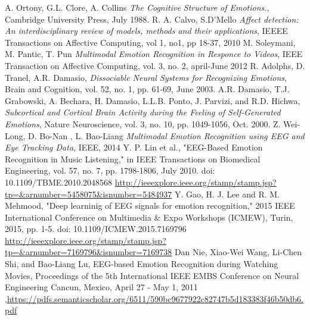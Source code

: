 \documentclass[10pt,journal,compsoc,twoside]{IEEEtran}
\begin{document}
\begin{thebibliography}{99}
A. Ortony, G.L. Clore, A. Collins \textit{The Cognitive Structure of Emotions.}, Cambridge University Press, July 1988.
 R. A. Calvo, S.D'Mello \textit{Affect detection: An interdisciplinary review of models, methods and their applications}, IEEEE Transactions on Affective Computing, vol 1, no1, pp 18-37, 2010
 M. Soleymani, M. Pantic, T. Pun \textit{Multimodal Emotion Recognition in Responce to Videos}, IEEE Transaction on Affective Computing, vol. 3, no. 2, april-June 2012
R. Adolphs, D. Tranel, A.R. Damasio, \textit{Dissociable Neural Systems for Recognizing Emotions}, Brain and Cognition, vol. 52, no. 1, pp. 61-69, June 2003.
 A.R. Damasio, T.J. Grabowski, A. Bechara, H. Damasio, L.L.B.
Ponto, J. Parvizi, and R.D. Hichwa, \textit{Subcortical and Cortical Brain
Activity during the Feeling of Self-Generated Emotions}, Nature
Neuroscience, vol. 3, no. 10, pp. 1049-1056, Oct. 2000.
 Z. Wei-Long, D. Bo-Nan , L. Bao-Liang 
\textit{Multimodal Emotion Recognition using EEG and Eye Tracking Data}, IEEE, 2014
Y. P. Lin et al., "EEG-Based Emotion Recognition in Music Listening," in IEEE Transactions on Biomedical Engineering, vol. 57, no. 7, pp. 1798-1806, July 2010.
doi: 10.1109/TBME.2010.2048568
\url{http://ieeexplore.ieee.org/stamp/stamp.jsp?tp=&arnumber=5458075&isnumber=5484937}
Y. Gao, H. J. Lee and R. M. Mehmood, "Deep learninig of EEG signals for emotion recognition," 2015 IEEE International Conference on Multimedia \& Expo Workshops (ICMEW), Turin, 2015, pp. 1-5.
doi: 10.1109/ICMEW.2015.7169796
\url{http://ieeexplore.ieee.org/stamp/stamp.jsp?tp=&arnumber=7169796&isnumber=7169738}
Dan Nie, Xiao-Wei Wang, Li-Chen Shi, and Bao-Liang Lu, EEG-based Emotion Recognition during Watching Movies, Proceedings of the 5th International IEEE EMBS Conference on Neural Engineering Cancun, Mexico, April 27 - May 1, 2011 ,\url{https://pdfs.semanticscholar.org/6511/590bc9677922c82747b5d183383f46b50db6.pdf}


\end{thebibliography}
\end{document}
